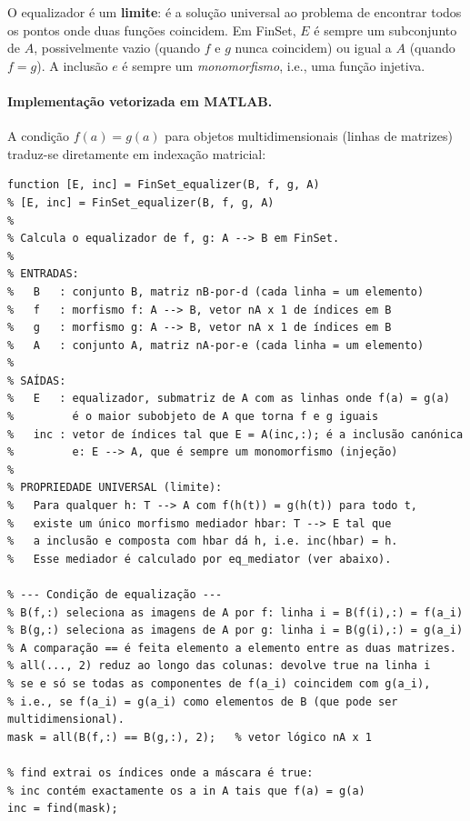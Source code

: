 \begin{remark}
	O equalizador é um \textbf{limite}: é a solução universal ao
	problema de encontrar todos os pontos onde duas funções coincidem.
	Em FinSet, $E$ é sempre um subconjunto de $A$, possivelmente vazio
	(quando $f$ e $g$ nunca coincidem) ou igual a $A$ (quando $f = g$).
	A inclusão $e$ é sempre um \emph{monomorfismo}, i.e., uma função
	injetiva.
\end{remark}

\paragraph{Implementação vetorizada em MATLAB.}
A condição $f(a) = g(a)$ para objetos multidimensionais
(linhas de matrizes) traduz-se diretamente em indexação matricial:

\begin{lstlisting}[style=matlab, caption={Equalizador em FinSet --- implementação e propriedade universal}]
function [E, inc] = FinSet_equalizer(B, f, g, A)
% [E, inc] = FinSet_equalizer(B, f, g, A)
%
% Calcula o equalizador de f, g: A --> B em FinSet.
%
% ENTRADAS:
%   B   : conjunto B, matriz nB-por-d (cada linha = um elemento)
%   f   : morfismo f: A --> B, vetor nA x 1 de índices em B
%   g   : morfismo g: A --> B, vetor nA x 1 de índices em B
%   A   : conjunto A, matriz nA-por-e (cada linha = um elemento)
%
% SAÍDAS:
%   E   : equalizador, submatriz de A com as linhas onde f(a) = g(a)
%         é o maior subobjeto de A que torna f e g iguais
%   inc : vetor de índices tal que E = A(inc,:); é a inclusão canónica
%         e: E --> A, que é sempre um monomorfismo (injeção)
%
% PROPRIEDADE UNIVERSAL (limite):
%   Para qualquer h: T --> A com f(h(t)) = g(h(t)) para todo t,
%   existe um único morfismo mediador hbar: T --> E tal que
%   a inclusão e composta com hbar dá h, i.e. inc(hbar) = h.
%   Esse mediador é calculado por eq_mediator (ver abaixo).

% --- Condição de equalização ---
% B(f,:) seleciona as imagens de A por f: linha i = B(f(i),:) = f(a_i)
% B(g,:) seleciona as imagens de A por g: linha i = B(g(i),:) = g(a_i)
% A comparação == é feita elemento a elemento entre as duas matrizes.
% all(..., 2) reduz ao longo das colunas: devolve true na linha i
% se e só se todas as componentes de f(a_i) coincidem com g(a_i),
% i.e., se f(a_i) = g(a_i) como elementos de B (que pode ser multidimensional).
mask = all(B(f,:) == B(g,:), 2);   % vetor lógico nA x 1

% find extrai os índices onde a máscara é true:
% inc contém exactamente os a in A tais que f(a) = g(a)
inc = find(mask);


\end{lstlisting}
